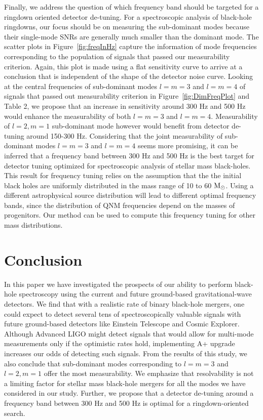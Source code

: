 Finally, we address the question of which frequency band should be targeted for a ringdown oriented detector de-tuning. For a spectroscopic analysis of black-hole ringdowns, our focus should be on measuring the sub-dominant modes because their single-mode SNRs are generally much smaller than the dominant mode. The scatter plots in Figure~\ref{fig:freqInHz} capture the information of mode frequencies corresponding to the population of signals that passed our measurability criterion. Again, this plot is made using a flat sensitivity curve to arrive at a conclusion that is independent of the shape of the detector noise curve. Looking at the central frequencies of sub-dominant modes $l=m=3$ and $l=m=4$ of signals that passed out measurability criterion in Figure~\ref{fig:DimFreqPlot} and Table 2, we propose that an increase in sensitivity around 300 Hz and 500 Hz would enhance the measurability of both $l=m=3$ and $l=m=4$. Measurability of $l=2, m=1$ sub-dominant mode however would benefit from detector de-tuning around 150-300 Hz. Considering that the joint measurability of sub-dominant modes $l=m=3$ and $l=m=4$ seems more promising, it can be inferred that a frequency band between 300 Hz and 500 Hz is the best target for detector tuning optimized for spectroscopic analysis of stellar mass black-holes. This result for frequency tuning relies on the assumption that the the initial black holes are uniformly distributed in the mass range of 10 to 60 $\mathrm{M}_\odot$. Using a different astrophysical source distribution will lead to different optimal frequency bands, since the distribution of QNM frequencies depend on the masses of progenitors. Our method can be used to compute this frequency tuning for other mass distributions.

\section{Conclusion}
\label{sec:conc}

 In this paper we have investigated the prospects of our ability to perform black-hole spectroscopy using the current and future ground-based gravitational-wave detectors. We find that with a realistic rate of binary black-hole mergers, one could expect to detect several tens of spectroscopically valuable signals with future ground-based detectors like Einstein Telescope and Cosmic Explorer. Although Advanced LIGO might detect signals that would allow for multi-mode measurements only if the optimistic rates hold, implementing A+ upgrade increases our odds of detecting such signals. From the results of this study, we also conclude that sub-dominant modes corresponding to $l=m=3$ and $l=2, m=1$ offer the most measurability. We emphasize that resolvability is not a limiting factor for stellar mass black-hole mergers for all the modes we have considered in our study. Further, we propose that a detector de-tuning around a frequency band between 300 Hz and 500 Hz is optimal for a ringdown-oriented search. 

